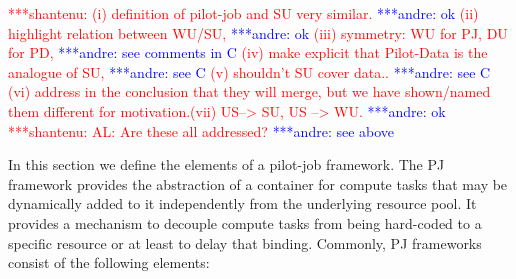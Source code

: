 \documentclass[conference,final]{IEEEtran}
\newcommand{\jhanote}[1]{ {\textcolor{red} { ***shantenu: #1 }}}
\newcommand{\alnote}[1]{ {\textcolor{blue} { ***andre: #1 }}}
\newcommand{\alnote}[1]{}
\newcommand{\jhanote}[1]{}
\begin{document}
\jhanote{(i) definition of pilot-job and SU very similar. \alnote{ok} (ii)
highlight relation between WU/SU, \alnote{ok} (iii) symmetry: WU for PJ, DU for
PD, \alnote{see comments in C} (iv) make explicit that Pilot-Data is the
analogue of SU, \alnote{see C} (v) shouldn't SU cover data.. \alnote{see C} (vi)
address in the conclusion that they will merge, but we have shown/named them
different for motivation.(vii) US--> SU, US --> WU.} \alnote{ok} \jhanote{AL:
Are these all addressed?}\alnote{see above}


In this section we define the elements of a pilot-job framework. The
PJ framework provides the abstraction of a container for compute
tasks that may be dynamically added to it independently from the
underlying resource pool. It provides a mechanism to decouple compute
tasks from being hard-coded to a specific resource or at least
to delay that binding. Commonly, PJ frameworks consist of the
following elements:
\end{document}
